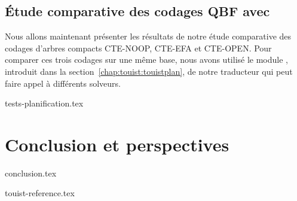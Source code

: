 \documentclass[a4paper,12pt,twoside]{extbook}
\begin{document}
\section{Étude comparative des codages QBF avec \touist}\label{chap:codages:tests} %

Nous allons maintenant présenter les résultats de notre étude comparative des codages d'arbres compacts CTE-NOOP, CTE-EFA et CTE-OPEN.
Pour comparer ces trois codages sur une même base, nous avons utilisé le module \touistplan, introduit dans la section~\ref{chap:touist:touistplan}, de notre traducteur \touist %
qui peut faire appel à différents solveurs.


{tests-planification.tex}



\chapter{Conclusion et perspectives}\label{chap:conclusion}
{conclusion.tex}

\appendix

{touist-reference.tex}



\printbibliography
\end{document}
